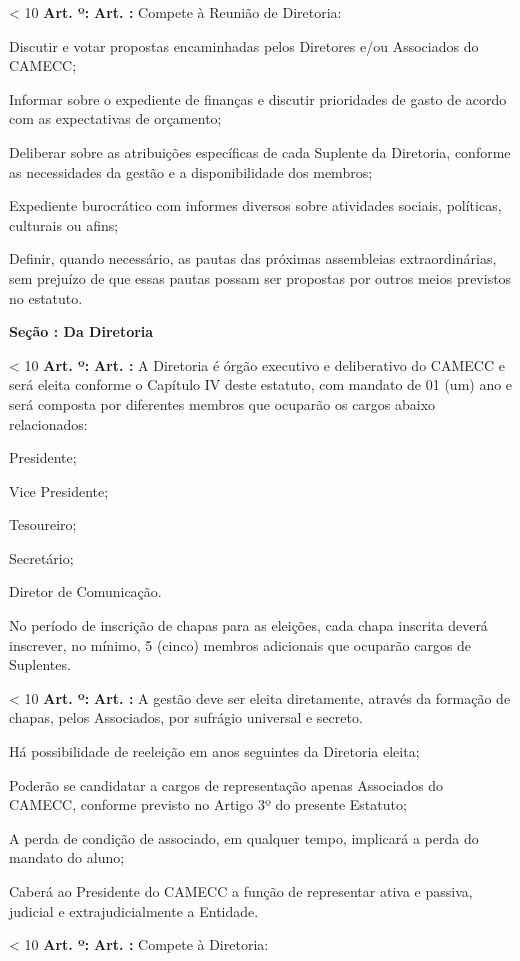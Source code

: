 \documentclass[capitulo]{br-lex}
\newcounter{chap}
\newcounter{sec}
\newcounter{art}
\newcommand{\secao}[1]{
    \vspace{20pt}
    \textbf{Seção \Roman{sec}: #1}
    \stepcounter{sec}
}
\renewcommand{\artigo}{
    \ifnum\value{art} < 10
        \textbf{Art. \arabic{art}º:}
    \else
        \textbf{Art. \arabic{art}:}
    \fi
    \stepcounter{art}
    \setcounter{inciso}{0}
    \setcounter{paragrafo}{0}
}
\begin{document}
\artigo Compete à Reunião de Diretoria:

\inciso Discutir e votar propostas encaminhadas pelos Diretores e/ou Associados do CAMECC;

\inciso Informar sobre o expediente de finanças e discutir prioridades de gasto de acordo com as expectativas de orçamento;

\inciso Deliberar sobre as atribuições específicas de cada Suplente da Diretoria, conforme as necessidades da gestão e a disponibilidade dos membros;

\inciso Expediente burocrático com informes diversos sobre atividades sociais, políticas, culturais ou afins;

\inciso Definir, quando necessário, as pautas das próximas assembleias extraordinárias, sem prejuízo de que essas pautas possam ser propostas por outros meios previstos no estatuto.

\secao{Da Diretoria}

\artigo A Diretoria é órgão executivo e deliberativo do CAMECC e será eleita conforme o Capítulo IV deste estatuto, com mandato de 01 (um) ano e será composta por diferentes membros que ocuparão os cargos abaixo relacionados:

\inciso Presidente;

\inciso Vice Presidente;

\inciso Tesoureiro;

\inciso Secretário;

\inciso Diretor de Comunicação.

\paragrafounico No período de inscrição de chapas para as eleições, cada chapa inscrita deverá inscrever, no mínimo, 5 (cinco) membros adicionais que ocuparão cargos de Suplentes.

\artigo A gestão deve ser eleita diretamente, através da formação de chapas, pelos Associados, por sufrágio universal e secreto.

\paragrafo Há possibilidade de reeleição em anos seguintes da Diretoria eleita;

\paragrafo Poderão se candidatar a cargos de representação apenas Associados do CAMECC, conforme previsto no Artigo 3º do presente Estatuto;

\paragrafo A perda de condição de associado, em qualquer tempo, implicará a perda do mandato do aluno;

\paragrafo Caberá ao Presidente do CAMECC a função de representar ativa e passiva, judicial e extrajudicialmente a Entidade.

\artigo Compete à Diretoria:
\end{document}
